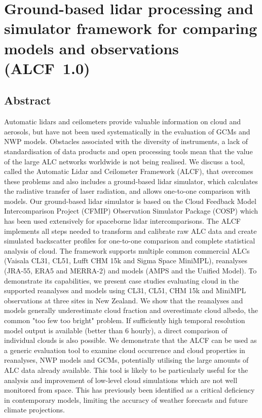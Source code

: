 \chapter{Ground-based lidar processing and simulator framework for comparing models and observations (ALCF~1.0)}

\section*{Abstract}

Automatic lidars and ceilometers provide valuable information on cloud and aerosols, but have not been used systematically in the evaluation of GCMs and NWP models. Obstacles associated with the diversity of instruments, a lack of standardisation of data products and open processing tools mean that the value of the large ALC networks worldwide is not being realised. We discuss a tool, called the
Automatic Lidar and Ceilometer Framework (ALCF), that overcomes these problems and also includes a ground-based lidar simulator, which calculates the radiative transfer of laser radiation, and allows one-to-one comparison with models. Our ground-based lidar simulator is based on the Cloud Feedback Model Intercomparison
Project (CFMIP) Observation Simulator Package (COSP) which has been used extensively for spaceborne lidar intercomparisons. The ALCF
implements all steps needed to transform  and calibrate raw ALC data and create  simulated 
backscatter profiles for one-to-one comparison and complete statistical analysis of cloud. The framework supports multiple common
commercial ALCs (Vaisala CL31, CL51, Lufft CHM 15k and Sigma Space MiniMPL), reanalyses (JRA-55,
ERA5 and MERRA-2) and models (AMPS and the Unified Model). To demonstrate its
capabilities, we present case studies evaluating cloud in the
supported reanalyses and models using CL31, CL51, CHM 15k and MiniMPL
observations at three sites in New Zealand. We show that the reanalyses
and models generally underestimate cloud fraction and overestimate cloud albedo,
the common "too few too bright" problem.
If sufficiently high temporal resolution model output is available (better than 6 hourly), a direct comparison of
individual clouds is also possible. We demonstrate that the ALCF can be used as a generic
evaluation tool to examine cloud occurrence and cloud properties in reanalyses, NWP models and GCMs, potentially utilising the large amounts of ALC data already available. This tool  is likely to be  particularly useful for the analysis and improvement of low-level cloud simulations which are not well monitored from space. This has previously been identified as a critical deficiency in contemporary models, limiting the accuracy of weather forecasts and future climate projections.


